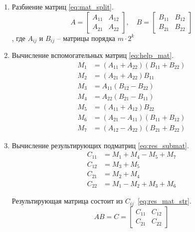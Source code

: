 \begin{enumerate}
	\item Разбиение матриц \eqref{eq:mat_split}.
	\begin{equation}
		\label{eq:mat_split}
	A = \begin{bmatrix} A_{11} & A_{12} \\ A_{21} & A_{22} \end{bmatrix}, \quad
	B = \begin{bmatrix} B_{11} & B_{12} \\ B_{21} & B_{22} \end{bmatrix}
	\end{equation}, где $A_{ij}$ и $B_{ij}$ -- матрицы порядка $m \cdot 2^{k}$
	
	\item Вычисление вспомогательных матриц \eqref{eq:help_mat}.
	\begin{equation}
		\label{eq:help_mat}
	\begin{aligned}
		M_1 &= (A_{11} + A_{22})(B_{11} + B_{22}) \\
		M_2 &= (A_{21} + A_{22})B_{11} \\
		M_3 &= A_{11}(B_{12} - B_{22}) \\
		M_4 &= A_{22}(B_{21} - B_{11}) \\
		M_5 &= (A_{11} + A_{12})B_{22} \\
		M_6 &= (A_{21} - A_{11})(B_{11} + B_{12}) \\
		M_7 &= (A_{12} - A_{22})(B_{21} + B_{22})
	\end{aligned}
	\end{equation}
	
	\item Вычисление результирующих подматриц \eqref{eq:res_submat}.
	\begin{equation}
		\label{eq:res_submat}
	\begin{aligned}
		C_{11} &= M_1 + M_4 - M_5 + M_7 \\
		C_{12} &= M_3 + M_5 \\
		C_{21} &= M_2 + M_4 \\
		C_{22} &= M_1 - M_2 + M_3 + M_6
	\end{aligned}
	\end{equation}
		
	Результирующая матрица состоит из $C_{ij}$~\eqref{eq:res_mat_str}.
	\begin{equation}
		\label{eq:res_mat_str}
		AB = C = \begin{bmatrix} C_{11} & C_{12} \\ C_{21} & C_{22} \end{bmatrix}
	\end{equation}
		
\end{enumerate}


